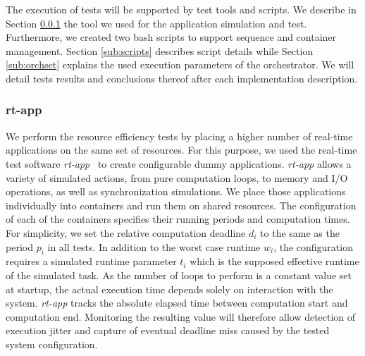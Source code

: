 \documentclass[]{scrartcl}
\begin{document}
The execution of tests will be supported by test tools and scripts. 
We describe in Section \ref{sub:rtapp} the tool we used for the application simulation and test. Furthermore, we created two bash scripts to support sequence and container management. Section \ref{sub:scripts} describes script details while Section \ref{sub:orchset} explains the used execution parameters of the orchestrator.
We will detail tests results and conclusions thereof after each implementation description.

\subsubsection{rt-app}
\label{sub:rtapp}

We perform the resource efficiency tests by placing a higher number of real-time applications on the same set of resources.
For this purpose, we used the real-time test software \emph{rt-app}~\cite{rtapp01} to create configurable dummy applications. 
\emph{rt-app} allows a variety of simulated actions, from pure computation loops, to memory and I/O operations, as well as synchronization simulations.
We place those applications individually into containers and run them on shared resources. 
The configuration of each of the containers specifies their running periods and computation times.
For simplicity, we set the relative computation deadline $d_i$ to the same as the period $p_i$ in all tests.
In addition to the worst case runtime $w_i$, the configuration requires a simulated runtime parameter $t_i$ which is the supposed effective runtime of the simulated task.
As the number of loops to perform is a constant value set at startup, the actual execution time depends solely on interaction with the system.
\emph{rt-app} tracks the absolute elapsed time between computation start and computation end.
Monitoring the resulting value will therefore allow detection of execution jitter and capture of eventual deadline miss caused by the tested system configuration.
\end{document}
